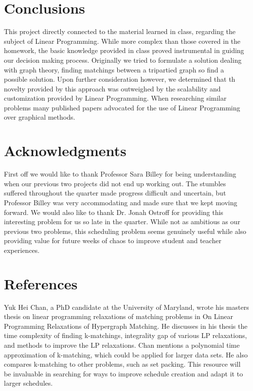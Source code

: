 \documentclass[11pt]{article}
\begin{document}
\section{Conclusions}
This project directly connected to the material learned in class, regarding the subject of Linear Programming. While more complex than those covered in the homework, the basic knowledge provided in class proved instrumental in guiding our decision making process. Originally we tried to formulate a solution dealing with graph theory, finding matchings between a tripartied graph so find a possible solution. Upon further consideration however, we determined that th novelty provided by this approach was outweighed by the scalability and customization provided by Linear Programming. When researching similar problems many published papers advocated for the use of Linear Programming over graphical methods.

\section{Acknowledgments}
First off we would like to thank Professor Sara Billey for being understanding when our previous two projects did not end up working out. The stumbles suffered throughout the quarter made progress difficult and uncertain, but Professor Billey was very accommodating and made sure that we kept moving forward. We would also like to thank Dr. Jonah Ostroff for providing this interesting problem for us so late in the quarter. While not as ambitious as our previous two problems, this scheduling problem seems genuinely useful while also providing value for future weeks of chaos to improve student and teacher experiences.

\section{References}
Yuk Hei Chan, a PhD candidate at the University of Maryland, wrote his masters thesis on linear programming relaxations of matching problems in On Linear Programming Relaxations of Hypergraph Matching. He discusses in his thesis the time complexity of finding k-matchings, integrality gap of various LP relaxations, and methods to improve the LP relaxations. Chan mentions a polynomial time approximation of k-matching, which could be applied for larger data sets. He also compares k-matching to other problems, such as set packing. This resource will be invaluable in searching for ways to improve schedule creation and adapt it to larger schedules.
\end{document}
